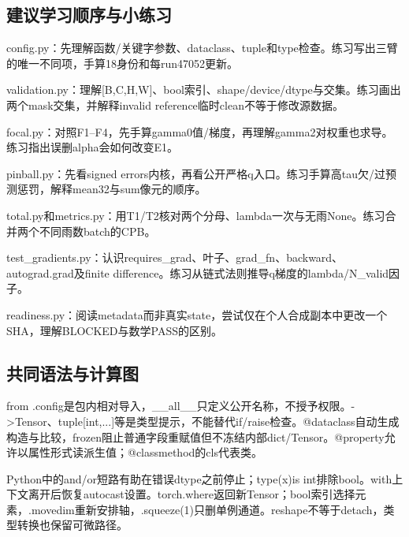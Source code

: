 \documentclass[UTF8,fontset=fandol,10pt]{ctexart}
\begin{document}
\subsection{建议学习顺序与小练习}

\noindent\textbullet\quad config.py：先理解函数/\allowbreak{}关键字参数、dataclass、tuple和type检查。练习写出三臂的唯一不同项，手算18身份和每run47052更新。\par
\noindent\textbullet\quad validation.py：理解[B,C,H,W]、bool索引、shape/\allowbreak{}device/\allowbreak{}dtype与交集。练习画出两个mask交集，并解释invalid reference临时clean不等于修改源数据。\par
\noindent\textbullet\quad focal.py：对照F1–F4，先手算gamma0值/\allowbreak{}梯度，再理解gamma2对权重也求导。练习指出误删alpha会如何改变E1。\par
\noindent\textbullet\quad pinball.py：先看signed errors内核，再看公开严格q入口。练习手算高tau欠/\allowbreak{}过预测惩罚，解释mean32与sum像元的顺序。\par
\noindent\textbullet\quad total.py和metrics.py：用T1/\allowbreak{}T2核对两个分母、lambda一次与无雨None。练习合并两个不同雨数batch的CPB。\par
\noindent\textbullet\quad test\_\allowbreak{}gradients.py：认识requires\_\allowbreak{}grad、叶子、grad\_\allowbreak{}fn、backward、autograd.grad及finite difference。练习从链式法则推导q梯度的lambda/\allowbreak{}N\_\allowbreak{}valid因子。\par
\noindent\textbullet\quad readiness.py：阅读metadata而非真实state，尝试仅在个人合成副本中更改一个SHA，理解BLOCKED与数学PASS的区别。\par

\subsection{共同语法与计算图}

from .config是包内相对导入，\_\allowbreak{}\_\allowbreak{}all\_\allowbreak{}\_\allowbreak{}只定义公开名称，不授予权限。->Tensor、tuple[int,...]等是类型提示，不能替代if/\allowbreak{}raise检查。@dataclass自动生成构造与比较，frozen阻止普通字段重赋值但不冻结内部dict/\allowbreak{}Tensor。@property允许以属性形式读派生值；@classmethod的cls代表类。

Python中的and/\allowbreak{}or短路有助在错误dtype之前停止；type(x)is int排除bool。with上下文离开后恢复autocast设置。torch.where返回新Tensor；bool索引选择元素，.movedim重新安排轴，.squeeze(1)只删单例通道。reshape不等于detach，类型转换也保留可微路径。
\end{document}
